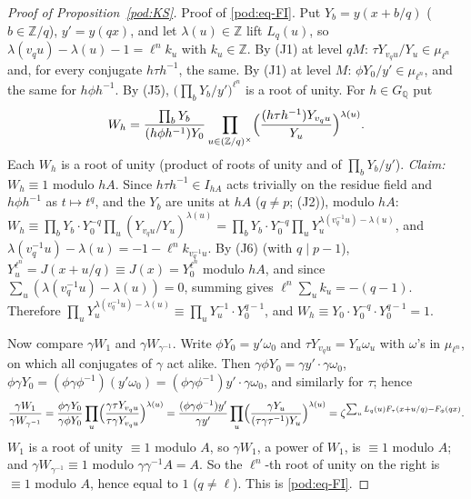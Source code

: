 \documentclass[10pt]{amsart}
\theoremstyle{definition}
\theoremstyle{remark}
\newcommand{\Z}{\mathbb Z}
\newcommand{\Q}{\mathbb Q}
\begin{document}
\begin{proof}[Proof of Proposition~\ref{pod:KS}]
Proof of \eqref{pod:eq-FI}. Put $Y_b=y(x+b/q)$ ($b\in\Z/q$), $y'=y(qx)$, and let $\lambda(u)\in\Z$ lift
$L_q(u)$, so $\lambda(v_qu)-\lambda(u)-1=\ell^nk_u$ with $k_u\in\Z$. By (J1) at level $qM$:
$\tau Y_{v_qu}/Y_u\in\mu_{\ell^n}$ and, for every conjugate $h\tau h^{-1}$, the same. By (J1) at level
$M$: $\phi Y_0/y'\in\mu_{\ell^n}$, and the same for $h\phi h^{-1}$. By (J5), $\bigl(\prod_bY_b/y'
\bigr)^{\ell^n}$ is a root of unity. For $h\in G_\Q$ put
\[
W_h=\frac{\prod_bY_b}{(h\phi h^{-1})Y_0}\prod_{u\in(\Z/q)^\times}\Bigl(\frac{(h\tau h^{-1})Y_{v_qu}}
{Y_u}\Bigr)^{\lambda(u)} .
\]
Each $W_h$ is a root of unity (product of roots of unity and of $\prod_bY_b/y'$). \emph{Claim:}
$W_h\equiv1$ modulo $hA$. Since $h\tau h^{-1}\in I_{hA}$ acts trivially on the residue field and
$h\phi h^{-1}$ as $t\mapsto t^q$, and the $Y_b$ are units at $hA$ ($q\ne p$; (J2)), modulo $hA$:
$W_h\equiv\prod_bY_b\cdot Y_0^{-q}\prod_u(Y_{v_qu}/Y_u)^{\lambda(u)}=\prod_bY_b\cdot Y_0^{-q}
\prod_uY_u^{\lambda(v_q^{-1}u)-\lambda(u)}$, and $\lambda(v_q^{-1}u)-\lambda(u)=-1-\ell^nk_{v_q^{-1}u}$.
By (J6) (with $q\mid p-1$), $Y_u^{\ell^n}=J(x+u/q)\equiv J(x)=Y_0^{\ell^n}$ modulo $hA$, and since
$\sum_u(\lambda(v_q^{-1}u)-\lambda(u))=0$, summing gives $\ell^n\sum_uk_u=-(q-1)$. Therefore $\prod_uY_u^{\lambda(v_q^{-1}u)-\lambda(u)}
\equiv\prod_uY_u^{-1}\cdot Y_0^{q-1}$, and $W_h\equiv Y_0\cdot Y_0^{-q}\cdot Y_0^{q-1}=1$.

Now compare $\gamma W_1$ and $\gamma W_{\gamma^{-1}}$. Write $\phi Y_0=y'\omega_0$ and $\tau Y_{v_qu}=
Y_u\omega_u$ with $\omega$'s in $\mu_{\ell^n}$, on which all conjugates of $\gamma$ act alike. Then
$\gamma\phi Y_0=\gamma y'\cdot\gamma\omega_0$, $\phi\gamma Y_0=(\phi\gamma\phi^{-1})(y'\omega_0)=
(\phi\gamma\phi^{-1})y'\cdot\gamma\omega_0$, and similarly for $\tau$; hence
\[
\frac{\gamma W_1}{\gamma W_{\gamma^{-1}}}=\frac{\phi\gamma Y_0}{\gamma\phi Y_0}\prod_u\Bigl(
\frac{\gamma\tau Y_{v_qu}}{\tau\gamma Y_{v_qu}}\Bigr)^{\lambda(u)}
=\frac{(\phi\gamma\phi^{-1})y'}{\gamma y'}\prod_u\Bigl(\frac{\gamma Y_u}{(\tau\gamma\tau^{-1})Y_u}
\Bigr)^{\lambda(u)}=\zeta^{\sum_uL_q(u)F_\tau(x+u/q)-F_\phi(qx)}.
\]
$W_1$ is a root of unity $\equiv1$ modulo $A$, so $\gamma W_1$, a power of $W_1$, is $\equiv1$ modulo
$A$; and $\gamma W_{\gamma^{-1}}\equiv1$ modulo $\gamma\gamma^{-1}A=A$. So the $\ell^n$-th root of
unity on the right is $\equiv1$ modulo $A$, hence equal to $1$ ($q\ne\ell$). This is \eqref{pod:eq-FI}.


\end{proof}
\end{document}
